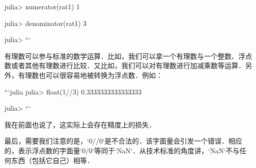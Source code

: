 julia> numerator(rat1)
1

julia> denominator(rat1)
3

julia>  
```

有理数可以参与标准的数学运算．比如，我们可以拿一个有理数与一个整数、浮点数或者其他有理数进行比较．又比如，我们可以对有理数进行加减乘数等运算．另外，有理数也可以很容易地被转换为浮点数．例如：

```julia
julia> float(1//3) 
0.3333333333333333

julia> 
```

我在前面也说了，这实际上会存在精度上的损失．

最后，需要我们注意的是，`0//0`是不合法的．该字面量会引发一个错误．相应的，表示浮点数的字面量`0/0`等同于`NaN`．从技术标准的角度讲，`NaN`不与任何东西（包括它自己）相等．
